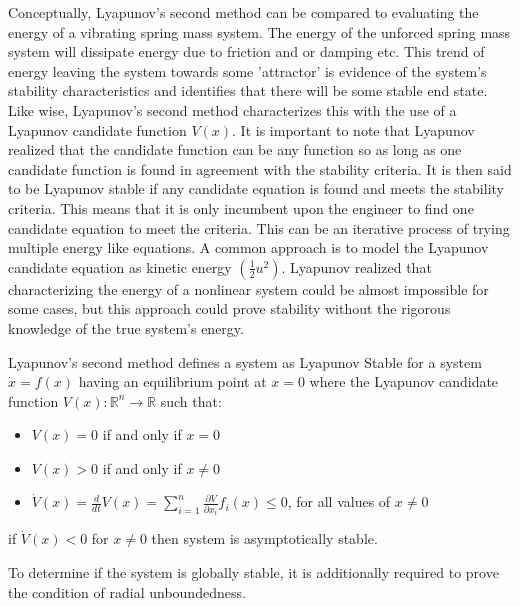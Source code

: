 Conceptually, Lyapunov's second method can be compared to evaluating the energy of a vibrating spring mass system.  The energy of the unforced spring mass system will dissipate energy due to friction and or damping etc.  This trend of energy leaving the system towards some 'attractor' is evidence of the system's stability characteristics and identifies that there will be some stable end state.  Like wise, Lyapunov's second method characterizes this with the use of a Lyapunov candidate function $V(x)$.  It is important to note that Lyapunov realized that the candidate function can be any function so as long as one candidate function is found in agreement with the stability criteria.  It is then said to be Lyapunov stable if any candidate equation is found and meets the stability criteria.  This means that it is only incumbent upon the engineer to find one candidate equation to meet the criteria.  This can be an iterative process of trying multiple energy like equations.  A common approach is to model the Lyapunov candidate equation as kinetic energy $(\frac{1}{2}u^2)$.  Lyapunov realized that characterizing the energy of a nonlinear system could be almost impossible for some cases, but this approach could prove stability without the rigorous knowledge of the true system's energy.

Lyapunov's second method defines a system as Lyapunov Stable for a system $\dot{x}=f(x)$ having an equilibrium point at $x=0$ where the Lyapunov candidate function $V(x):\mathbb{R}^n \rightarrow \mathbb{R}$ such that:
\begin{itemize}
	\item $V(x)=0$ if and only if $x=0$
	\item $V(x)>0$ if and only if $x\neq0$
	\item $\dot{V}(x)=\frac{d}{dt}V(x)=\sum\limits_{i=1}^{n} \frac{\partial V}{\partial x_i}f_i(x) \leq 0$, for all values of $x\neq 0$		
\end{itemize}

if $\dot{V}(x) < 0$ for $x\neq 0$ then system is asymptotically stable.

To determine if the system is globally stable, it is additionally required to prove the condition of radial unboundedness.











